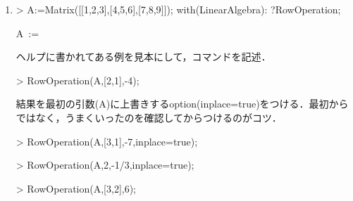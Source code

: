 \begin{enumerate}
\item
\begin{MapleInput}
> A:=Matrix([[1,2,3],[4,5,6],[7,8,9]]); with(LinearAlgebra): ?RowOperation;
\end{MapleInput}
\begin{MapleOutput}
A\, := \, 
\end{MapleOutput}
ヘルプに書かれてある例を見本にして，コマンドを記述．
\begin{MapleInput}
> RowOperation(A,[2,1],-4);
\end{MapleInput}
\begin{MapleOutput}
\end{MapleOutput}
結果を最初の引数(A)に上書きするoption(inplace=true)をつける．最初からではなく，うまくいったのを確認してからつけるのがコツ．
\begin{MapleInput}
> RowOperation(A,[3,1],-7,inplace=true);
\end{MapleInput}
\begin{MapleOutput}
\end{MapleOutput}
\begin{MapleInput}
> RowOperation(A,2,-1/3,inplace=true);
\end{MapleInput}
\begin{MapleOutput}
\end{MapleOutput}
\begin{MapleInput}
> RowOperation(A,[3,2],6);
\end{MapleInput}
\begin{MapleOutput}

\end{MapleOutput}
\end{enumerate}
